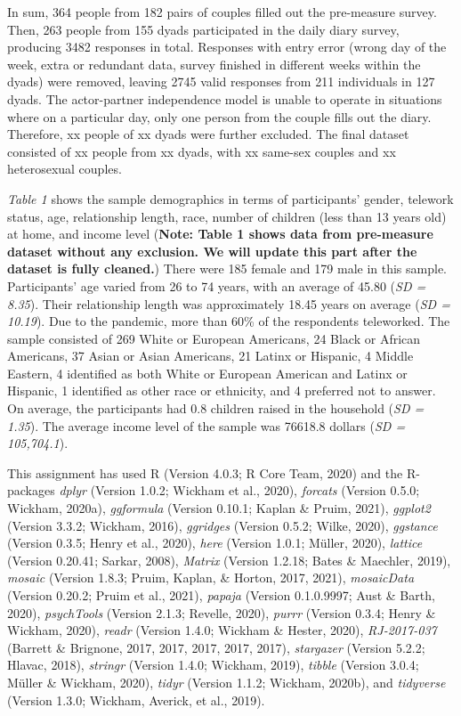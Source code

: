 \documentclass[
  english,
  man]{apa6}
\begin{document}
In sum, 364 people from 182 pairs of couples filled out the pre-measure survey. Then, 263 people from 155 dyads participated in the daily diary survey, producing 3482 responses in total. Responses with entry error (wrong day of the week, extra or redundant data, survey finished in different weeks within the dyads) were removed, leaving 2745 valid responses from 211 individuals in 127 dyads. The actor-partner independence model is unable to operate in situations where on a particular day, only one person from the couple fills out the diary. Therefore, xx people of xx dyads were further excluded. The final dataset consisted of xx people from xx dyads, with xx same-sex couples and xx heterosexual couples.

\emph{Table 1} shows the sample demographics in terms of participants' gender, telework status, age, relationship length, race, number of children (less than 13 years old) at home, and income level (\textbf{Note: Table 1 shows data from pre-measure dataset without any exclusion. We will update this part after the dataset is fully cleaned.}) There were 185 female and 179 male in this sample. Participants' age varied from 26 to 74 years, with an average of 45.80 (\emph{SD = 8.35}). Their relationship length was approximately 18.45 years on average (\emph{SD = 10.19}). Due to the pandemic, more than 60\% of the respondents teleworked. The sample consisted of 269 White or European Americans, 24 Black or African Americans, 37 Asian or Asian Americans, 21 Latinx or Hispanic, 4 Middle Eastern, 4 identified as both White or European American and Latinx or Hispanic, 1 identified as other race or ethnicity, and 4 preferred not to answer. On average, the participants had 0.8 children raised in the household (\emph{SD = 1.35}). The average income level of the sample was 76618.8 dollars (\emph{SD = 105,704.1}).

\hfill\break
\hfill\break
This assignment has used R (Version 4.0.3; R Core Team, 2020) and the R-packages \emph{dplyr} (Version 1.0.2; Wickham et al., 2020), \emph{forcats} (Version 0.5.0; Wickham, 2020a), \emph{ggformula} (Version 0.10.1; Kaplan \& Pruim, 2021), \emph{ggplot2} (Version 3.3.2; Wickham, 2016), \emph{ggridges} (Version 0.5.2; Wilke, 2020), \emph{ggstance} (Version 0.3.5; Henry et al., 2020), \emph{here} (Version 1.0.1; Müller, 2020), \emph{lattice} (Version 0.20.41; Sarkar, 2008), \emph{Matrix} (Version 1.2.18; Bates \& Maechler, 2019), \emph{mosaic} (Version 1.8.3; Pruim, Kaplan, \& Horton, 2017, 2021), \emph{mosaicData} (Version 0.20.2; Pruim et al., 2021), \emph{papaja} (Version 0.1.0.9997; Aust \& Barth, 2020), \emph{psychTools} (Version 2.1.3; Revelle, 2020), \emph{purrr} (Version 0.3.4; Henry \& Wickham, 2020), \emph{readr} (Version 1.4.0; Wickham \& Hester, 2020), \emph{RJ-2017-037} (Barrett \& Brignone, 2017, 2017, 2017, 2017, 2017), \emph{stargazer} (Version 5.2.2; Hlavac, 2018), \emph{stringr} (Version 1.4.0; Wickham, 2019), \emph{tibble} (Version 3.0.4; Müller \& Wickham, 2020), \emph{tidyr} (Version 1.1.2; Wickham, 2020b), and \emph{tidyverse} (Version 1.3.0; Wickham, Averick, et al., 2019).
\end{document}

